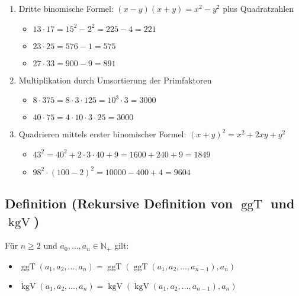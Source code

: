 	\begin{enumerate}
	
		\item Dritte binomische Formel: $(x-y)(x+y)=x^2-y^2$ plus Quadratzahlen
		
		\begin{itemize}
		
			\item $13\cdot 17=15^2-2^2=225-4=221$
			\item $23\cdot 25=576-1=575$
			\item $27\cdot 33=900-9=891$ 
			
		\end{itemize}		
		
		\item Multiplikation durch Umsortierung der Primfaktoren
			
		\begin{itemize}
	
			\item $8\cdot 375=8\cdot 3\cdot 125=10^3\cdot 3=3000$
			\item $40\cdot 75=4\cdot 10\cdot 3\cdot 25=3000$
			
		\end{itemize}
		
		\item Quadrieren mittels erster binomischer Formel: $(x+y)^2=x^2+2xy+y^2$
		
		\begin{itemize}
		
			\item $43^2=40^2+2\cdot 3\cdot 40+9=1600+240+9=1849$
			\item $98^2\cdot (100-2)^2=10000-400+4=9604$
			
		\end{itemize}

	\end{enumerate}


\subsection[Rekursive Definition von $\operatorname{ggT}$ und $\operatorname{kgV}$]{Definition (Rekursive Definition von $\operatorname{ggT}$ und $\operatorname{kgV}$)}

	Für $n\geq 2$ und $a_0,\dots,a_n\in\mathbb{N_+}$ gilt:
	
	\begin{itemize}
		
		\item $\operatorname{ggT}(a_1,a_2,\dots,a_n)=
		\operatorname{ggT}(\operatorname{ggT}(a_1,a_2,\dots,a_{n-1}),a_n)$
		\item $\operatorname{kgV}(a_1,a_2,\dots,a_n)=
		\operatorname{kgV}(\operatorname{kgV}(a_1,a_2,\dots,a_{n-1}),a_n)$
		
	\end{itemize}
	
